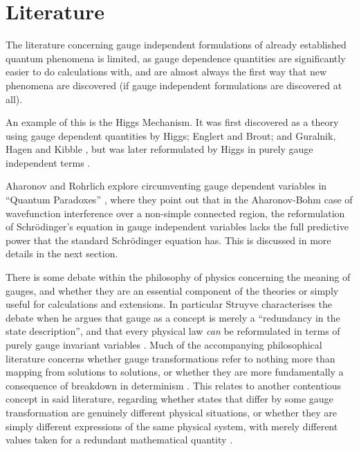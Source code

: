 \section{Literature}
\label{sec:literature}

The literature concerning gauge independent formulations of already established
quantum phenomena is limited, as gauge dependence quantities are significantly
easier to do calculations with, and are almost always the first way that new
phenomena are discovered (if gauge independent formulations are discovered at
all).

An example of this is the Higgs Mechanism. It was first discovered as a theory
using gauge dependent quantities by Higgs; Englert and Brout; and Guralnik,
Hagen and Kibble \cite{higgs-1964,englert-brout,guralnik-hagen-kibble}, but was
later reformulated by Higgs in purely gauge independent terms \cite{higgs-1966}.

Aharonov and Rohrlich explore circumventing gauge dependent variables in
``Quantum Paradoxes'' \cite{aharonov-rohrlich}, where they point out that in the
Aharonov-Bohm case of wavefunction interference over a non-simple connected
region, the reformulation of Schr\"odinger's equation in gauge independent
variables lacks the full predictive power that the standard Schr\"odinger
equation has. This is discussed in more details in the next section.

There is some debate within the philosophy of physics concerning the meaning of
gauges, and whether they are an essential component of the theories or simply
useful for calculations and extensions. In particular Struyve characterises the
debate when he argues that gauge as a concept is merely a ``redundancy in the
state description'', and that every physical law \textit{can} be reformulated in
terms of purely gauge invariant variables \cite{struyve}. Much of the
accompanying philosophical literature concerns whether gauge transformations
refer to nothing more than mapping from solutions to solutions, or whether they
are more fundamentally a consequence of breakdown in determinism
\cite{struyve,earman}. This relates to another contentious concept in said
literature, regarding whether states that differ by some gauge transformation
are genuinely different physical situations, or whether they are simply
different expressions of the same physical system, with merely different values
taken for a redundant mathematical quantity \cite{belot}.

